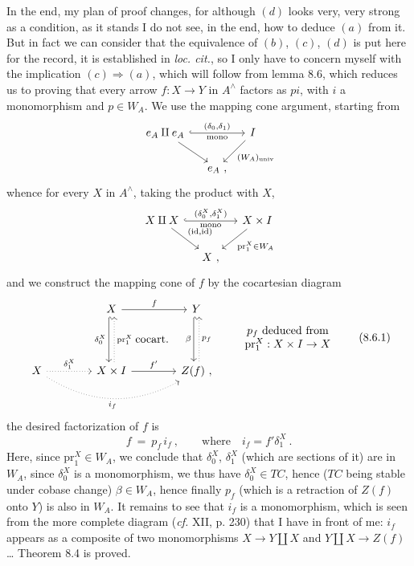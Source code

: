 \documentclass[11pt]{article}
\newcommand{\printedpage}[1]{\marginpar{\footnotesize p.~#1}}
\newcommand{\msp}[1]{\marginpar{\footnotesize [#1]}}
\begin{document}
In the end, my plan of proof changes, for although $(d)$ looks very, very strong as a condition, as it stands I do not see, in the end, how to deduce $(a)$ from it. But in fact we can consider that the equivalence of $(b)$, $(c)$, $(d)$ is put here for the record, it is established in \textit{loc. cit.}, so I only have to concern myself with the implication $(c) \Longrightarrow (a)$, which will follow
\msp{page 111}
from lemma 8.6, which reduces us to proving that every arrow $f : X \longrightarrow Y$ in $A^\wedge$ factors as $pi$, with $i$ a monomorphism and $p \in W_A$. We use the mapping cone argument, starting from
\[
\begin{tikzcd}[column sep=small]
e_A \amalg e_A \arrow[rr, hook, "{(\delta_0,\delta_1)}", "\text{mono}"'] \arrow[dr] & & I \arrow[dl, "(W_A)_{\mathrm{univ}}"] \\
& e_A\ , &
\end{tikzcd}
\]
whence for every $X$ in $A^\wedge$, taking the product with $X$,
\[
\begin{tikzcd}[column sep=small]
X \amalg X \arrow[rr, hook, "{(\delta_0^X,\delta_1^X)}", "\text{mono}"'] \arrow[dr, "{(\mathrm{id},\mathrm{id})}"] & & X \times I \arrow[dl, "\mathrm{pr}_1^X \in W_A"] \\
& X\ , &
\end{tikzcd}
\]
\printedpage{61}
and we construct the mapping cone of $f$ by the cocartesian diagram
\[
\begin{tikzcd}[column sep=4em,row sep=4em]
 & X \arrow[r, "f"] \arrow[d, hook, shift right, "\delta_0^X"'] \arrow[dr, phantom, "\text{cocart.}"] & Y \arrow[d, hook, shift right, "\beta"'] \\
X \arrow[r, dotted, "\delta_1^X"] \arrow[rr, dotted, bend right, "i_f"'] & X \times I \arrow[r, "f'"] \arrow[u, dotted, shift right, "\mathrm{pr}_1^X"'] & Z(f)\ , \arrow[u, dotted, shift right, "p_f"']
\end{tikzcd}
\qquad
\begin{array}{c}
p_f \text{ deduced from} \\
\mathrm{pr}_1^X : X \times I \to X
\end{array}
\tag*{(8.6.1)}
\]
the desired factorization of $f$ is
\[
f \ = \ p_f\, i_f\ , \qquad \text{where}\quad i_f = f'\delta_1^X\ .
\]
Here, since $\mathrm{pr}_1^X \in W_A$, we conclude that
\msp{page 112}
$\delta_0^X$, $\delta_1^X$ (which are sections of it) are in $W_A$, since $\delta_0^X$ is a monomorphism, we thus have $\delta_0^X \in TC$, hence ($TC$ being stable under cobase change) $\beta \in W_A$, hence finally $p_f$ (which is a retraction of $Z(f)$ onto $Y$) is also in $W_A$. It remains to see that $i_f$ is a monomorphism, which is seen from the more complete diagram (\textit{cf.} XII, p. 230) that I have in front of me: $i_f$ appears as a composite of two monomorphisms $X \longrightarrow Y \amalg X$ and $Y \amalg X \longrightarrow Z(f)$ \ldots{} Theorem 8.4 is proved.
\end{document}
